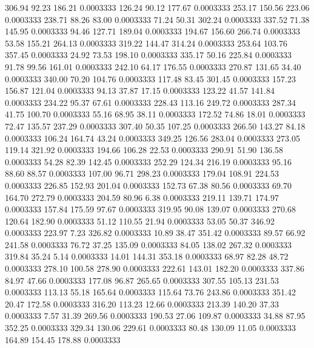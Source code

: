  306.94   92.23  186.21   0.0003333
 126.24   90.12  177.67   0.0003333
 253.17  150.56  223.06   0.0003333
 238.71   88.26   83.00   0.0003333
  71.24   50.31  302.24   0.0003333
 337.52   71.38  145.95   0.0003333
  94.46  127.71  189.04   0.0003333
 194.67  156.60  266.74   0.0003333
  53.58  155.21  264.13   0.0003333
 319.22  144.47  314.24   0.0003333
 253.64  103.76  357.45   0.0003333
  24.92   73.53  198.10   0.0003333
 335.17   50.16  225.84   0.0003333
  91.78   99.56  161.01   0.0003333
 242.10   64.17  176.55   0.0003333
 270.87  131.65   34.40   0.0003333
 340.00   70.20  104.76   0.0003333
 117.48   83.45  301.45   0.0003333
 157.23  156.87  121.04   0.0003333
  94.13   37.87   17.15   0.0003333
 123.22   41.57  141.84   0.0003333
 234.22   95.37   67.61   0.0003333
 228.43  113.16  249.72   0.0003333
 287.34   41.75  100.70   0.0003333
  55.16   68.95   38.11   0.0003333
 172.52   74.86   18.01   0.0003333
  72.47  135.57  237.29   0.0003333
 307.40   50.35  107.25   0.0003333
 266.50  143.27   84.18   0.0003333
 106.24  164.74   43.24   0.0003333
 349.25  126.56  283.04   0.0003333
 273.05  119.14  321.92   0.0003333
 194.66  106.28   22.53   0.0003333
 290.91   51.90  136.58   0.0003333
  54.28   82.39  142.45   0.0003333
 252.29  124.34  216.19   0.0003333
  95.16   88.60   88.57   0.0003333
 107.00   96.71  298.23   0.0003333
 179.04  108.91  224.53   0.0003333
 226.85  152.93  201.04   0.0003333
 152.73   67.38   80.56   0.0003333
  69.70  164.70  272.79   0.0003333
 204.59   80.96    6.38   0.0003333
 219.11  139.71  174.97   0.0003333
 157.84  175.59   97.67   0.0003333
 319.95   90.08  139.07   0.0003333
 270.68  120.64  182.90   0.0003333
  51.12  110.55   21.94   0.0003333
  53.05   50.37  346.92   0.0003333
 223.97    7.23  326.82   0.0003333
  10.89   38.47  351.42   0.0003333
  89.57   66.92  241.58   0.0003333
  76.72   37.25  135.09   0.0003333
  84.05  138.02  267.32   0.0003333
 319.84   35.24    5.14   0.0003333
  14.01  144.31  353.18   0.0003333
  68.97   82.28   48.72   0.0003333
 278.10  100.58  278.90   0.0003333
 222.61  143.01  182.20   0.0003333
 337.86   84.97   47.66   0.0003333
 177.08   96.87  265.65   0.0003333
 307.55  105.13  231.53   0.0003333
 113.13   55.18  165.64   0.0003333
 115.64   73.76  243.86   0.0003333
 351.42   20.47  172.58   0.0003333
 316.20  113.23   12.66   0.0003333
 213.39  140.20   37.33   0.0003333
   7.57   31.39  269.56   0.0003333
 190.53   27.06  109.87   0.0003333
  34.88   87.95  352.25   0.0003333
 329.34  130.06  229.61   0.0003333
  80.48  130.09   11.05   0.0003333
 164.89  154.45  178.88   0.0003333
